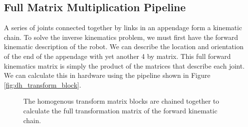 \subsection{Full Matrix Multiplication Pipeline}

A series of joints connected together by links in an appendage form a kinematic chain. To solve the inverse kinematics problem, we must first have the forward kinematic description of the robot. We can describe the location and orientation of the end of the appendage with yet another 4 by matrix. This full forward kinematics matrix is simply the product of the matrices that describe each joint. We can calculate this in hardware using the pipeline shown in Figure \ref{fig:dh_transform_block}.

\begin{figure}[ht]
\center
{}
\caption{The homogenous transform matrix blocks are chained together to calculate the full transformation matrix of the forward kinematic chain.}
\label{fig:dh_transform_pipeline}
\end{figure}
